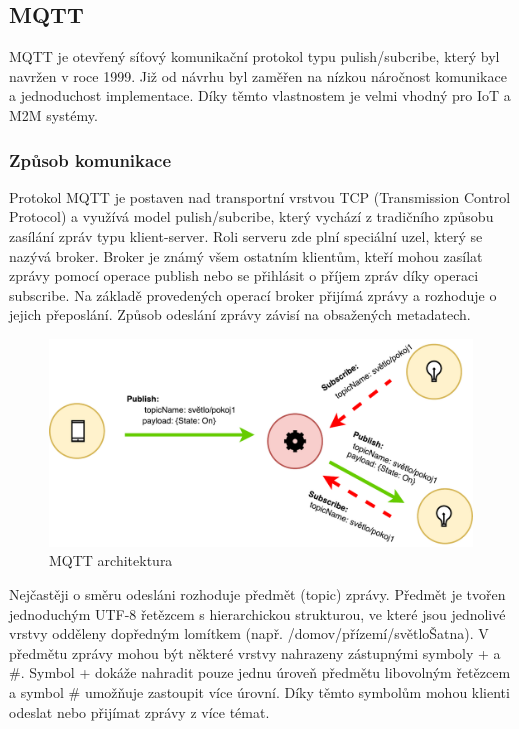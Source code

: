 \subsection{MQTT}
  MQTT je otevřený síťový komunikační protokol typu pulish/subcribe, který byl navržen
  v roce 1999. Již od návrhu byl zaměřen na nízkou náročnost komunikace a jednoduchost
  implementace. Díky těmto vlastnostem je velmi vhodný pro IoT a M2M systémy. \cite{mqtt}
  \subsubsection{Způsob komunikace}
  
  Protokol MQTT je postaven nad transportní vrstvou TCP (Transmission Control Protocol)
  a využívá model pulish/subcribe, který vychází z tradičního způsobu zasílání zpráv
  typu klient-server. Roli serveru zde plní speciální uzel, který se nazývá broker.
  Broker je známý všem ostatním klientům, kteří mohou zasílat zprávy pomocí operace
  publish nebo se přihlásit o příjem zpráv díky operaci subscribe.
  Na základě provedených operací broker přijímá zprávy a rozhoduje o jejich přeposlání.
  Způsob odeslání zprávy závisí na obsažených metadatech.
  
\begin{figure}[ht]
\begin{center}
\includegraphics[scale=0.38]{pictures/mqtt}
\caption{MQTT architektura}
\label{obr.mqtt-arch}
\end{center}
\end{figure}
  
  Nejčastěji o směru odesláni rozhoduje předmět (topic) zprávy. Předmět je tvořen
  jednoduchým UTF-8 řetězcem s hierarchickou strukturou, ve které jsou jednolivé
  vrstvy odděleny dopředným lomítkem (např. /domov/přízemí/světloŠatna). V předmětu
  zprávy mohou být některé vrstvy nahrazeny zástupnými symboly + a \#. Symbol + dokáže
  nahradit pouze jednu úroveň předmětu libovolným řetězcem a symbol \# umožňuje
  zastoupit více úrovní. Díky těmto symbolům mohou klienti odeslat nebo přijímat
  zprávy z více témat.
  
